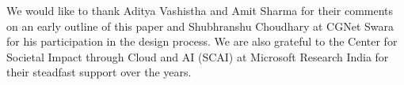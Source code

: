 \documentclass[manuscript]{acmart}
\begin{document}
\maketitle




\begin{acks}
We would like to thank Aditya Vashistha and Amit Sharma for their comments on an early outline of this paper and Shubhranshu Choudhary at CGNet Swara for his participation in the design process. We are also grateful to the Center for Societal Impact through Cloud and AI (SCAI) at Microsoft Research India for their steadfast support over the years.
\end{acks}

%




\end{document}

